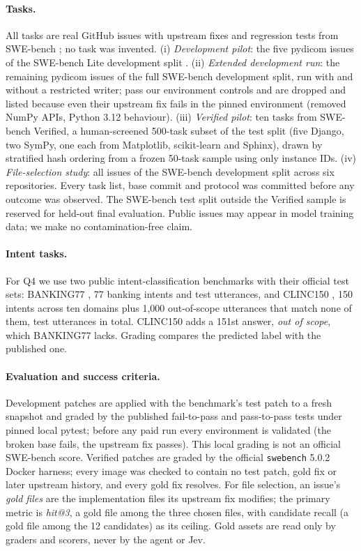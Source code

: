 \documentclass{article}
\begin{document}
\paragraph{Tasks.}
All tasks are real GitHub issues with upstream fixes and regression tests from SWE-bench \citep{swebench}; no task was invented. (i) \emph{Development pilot}: the five pydicom issues of the SWE-bench Lite development split \citep{dataset}. (ii) \emph{Extended development run}: the remaining \AgFrozen{} pydicom issues of the full SWE-bench development split, run with and without a restricted writer; \AgValid{} pass our environment controls and \AgDropped{} are dropped and listed because even their upstream fix fails in the pinned environment (removed NumPy APIs, Python 3.12 behaviour). (iii) \emph{Verified pilot}: ten tasks from SWE-bench Verified, a human-screened 500-task subset of the test split \citep{verified,verifieddata} (five Django, two SymPy, one each from Matplotlib, scikit-learn and Sphinx), drawn by stratified hash ordering from a frozen 50-task sample using only instance IDs. (iv) \emph{File-selection study}: all \LocTotal{} issues of the SWE-bench development split across six repositories. Every task list, base commit and protocol was committed before any outcome was observed. The SWE-bench test split outside the Verified sample is reserved for held-out final evaluation. Public issues may appear in model training data; we make no contamination-free claim.

\paragraph{Intent tasks.}
For Q4 we use two public intent-classification benchmarks with their official test sets: BANKING77 \citep{banking77}, 77 banking intents and \BkN{} test utterances, and CLINC150 \citep{clinc150}, 150 intents across ten domains plus 1{,}000 out-of-scope utterances that match none of them, \ClN{} test utterances in total. CLINC150 adds a 151st answer, \emph{out of scope}, which BANKING77 lacks. Grading compares the predicted label with the published one.

\paragraph{Evaluation and success criteria.}
Development patches are applied with the benchmark's test patch to a fresh snapshot and graded by the published fail-to-pass and pass-to-pass tests under pinned local pytest; before any paid run every environment is validated (the broken base fails, the upstream fix passes). This local grading is not an official SWE-bench score. Verified patches are graded by the official \texttt{swebench} 5.0.2 Docker harness; every image was checked to contain no test patch, gold fix or later upstream history, and every gold fix resolves. For file selection, an issue's \emph{gold files} are the implementation files its upstream fix modifies; the primary metric is \emph{hit@3}, a gold file among the three chosen files, with candidate recall (a gold file among the 12 candidates) as its ceiling. Gold assets are read only by graders and scorers, never by the agent or Jev.
\end{document}
